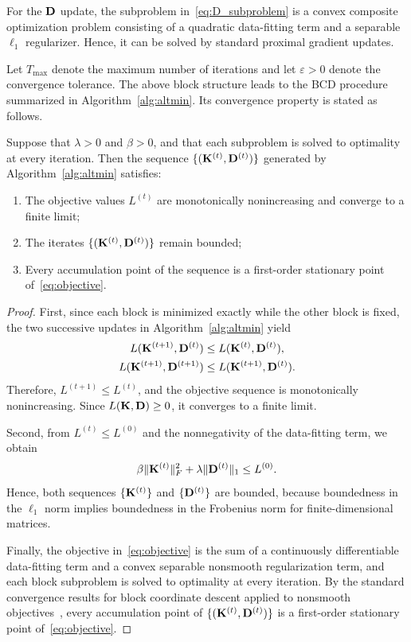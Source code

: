 For the $\mathbf{D}$ update, the subproblem in~\eqref{eq:D_subproblem} is a convex composite optimization problem consisting of a quadratic data-fitting term and a separable $\ell_1$ regularizer. Hence, it can be solved by standard proximal gradient updates.

Let $T_{\max}$ denote the maximum number of iterations and let $\varepsilon>0$ denote the convergence tolerance. The above block structure leads to the BCD procedure summarized in Algorithm~\ref{alg:altmin}. Its convergence property is stated as follows.

\begin{theorem}
\label{thm:altmin_convergence}
Suppose that $\lambda>0$ and $\beta>0$, and that each subproblem is solved to optimality at every iteration. Then the sequence $\{(\mathbf{K}^{(t)}, \mathbf{D}^{(t)})\}$ generated by Algorithm~\ref{alg:altmin} satisfies:
\begin{enumerate}
\item The objective values $L^{(t)}$ are monotonically nonincreasing and converge to a finite limit;
\item The iterates $\{(\mathbf{K}^{(t)},\mathbf{D}^{(t)})\}$ remain bounded;
\item Every accumulation point of the sequence is a first-order stationary point of~\eqref{eq:objective}.
\end{enumerate}
\end{theorem}

\begin{proof}
First, since each block is minimized exactly while the other block is fixed, the two successive updates in Algorithm~\ref{alg:altmin} yield
\[
\begin{aligned}
L(\mathbf{K}^{(t+1)},\mathbf{D}^{(t)}) &\le L(\mathbf{K}^{(t)},\mathbf{D}^{(t)}), \\
L(\mathbf{K}^{(t+1)},\mathbf{D}^{(t+1)}) &\le L(\mathbf{K}^{(t+1)},\mathbf{D}^{(t)}).
\end{aligned}
\]
Therefore, $L^{(t+1)} \le L^{(t)}$, and the objective sequence is monotonically nonincreasing. Since $L(\mathbf{K},\mathbf{D}) \ge 0$, it converges to a finite limit.

Second, from $L^{(t)} \le L^{(0)}$ and the nonnegativity of the data-fitting term, we obtain
\[
\beta\|\mathbf{K}^{(t)}\|_F^2 + \lambda\|\mathbf{D}^{(t)}\|_1 \le L^{(0)}.
\]
Hence, both sequences $\{\mathbf{K}^{(t)}\}$ and $\{\mathbf{D}^{(t)}\}$ are bounded, because boundedness in the $\ell_1$ norm implies boundedness in the Frobenius norm for finite-dimensional matrices.

Finally, the objective in~\eqref{eq:objective} is the sum of a continuously differentiable data-fitting term and a convex separable nonsmooth regularization term, and each block subproblem is solved to optimality at every iteration. By the standard convergence results for block coordinate descent applied to nonsmooth objectives~\cite{Tseng2001}, every accumulation point of $\{(\mathbf{K}^{(t)},\mathbf{D}^{(t)})\}$ is a first-order stationary point of~\eqref{eq:objective}.
\end{proof}

